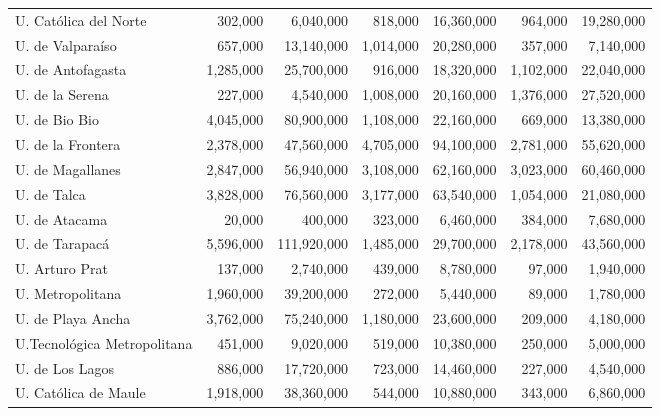 \documentclass[twocolumn]{article}
\begin{document}
\begin{table}
\begin{tabular}{l rr rr rr}
U. Católica del Norte          &     302,000 &     6,040,000 &     818,000 &    16,360,000 &     964,000 &    19,280,000 \\
U. de Valparaíso               &     657,000 &    13,140,000 &   1,014,000 &    20,280,000 &     357,000 &     7,140,000 \\
U. de Antofagasta              &   1,285,000 &    25,700,000 &     916,000 &    18,320,000 &   1,102,000 &    22,040,000 \\
U. de la Serena                &     227,000 &     4,540,000 &   1,008,000 &    20,160,000 &   1,376,000 &    27,520,000 \\
U. de Bio Bio                  &   4,045,000 &    80,900,000 &   1,108,000 &    22,160,000 &     669,000 &    13,380,000 \\
U. de la Frontera              &   2,378,000 &    47,560,000 &   4,705,000 &    94,100,000 &   2,781,000 &    55,620,000 \\
U. de Magallanes               &   2,847,000 &    56,940,000 &   3,108,000 &    62,160,000 &   3,023,000 &    60,460,000 \\
U. de Talca                    &   3,828,000 &    76,560,000 &   3,177,000 &    63,540,000 &   1,054,000 &    21,080,000 \\
U. de Atacama                  &      20,000 &       400,000 &     323,000 &     6,460,000 &     384,000 &     7,680,000 \\
U. de Tarapacá                 &   5,596,000 &   111,920,000 &   1,485,000 &    29,700,000 &   2,178,000 &    43,560,000 \\
U. Arturo Prat                 &     137,000 &     2,740,000 &     439,000 &     8,780,000 &      97,000 &     1,940,000 \\
U. Metropolitana               &   1,960,000 &    39,200,000 &     272,000 &     5,440,000 &      89,000 &     1,780,000 \\
U. de Playa Ancha              &   3,762,000 &    75,240,000 &   1,180,000 &    23,600,000 &     209,000 &     4,180,000 \\
U.Tecnológica Metropolitana    &     451,000 &     9,020,000 &     519,000 &    10,380,000 &     250,000 &     5,000,000 \\
U. de Los Lagos                &     886,000 &    17,720,000 &     723,000 &    14,460,000 &     227,000 &     4,540,000 \\
U. Católica de Maule           &   1,918,000 &    38,360,000 &     544,000 &    10,880,000 &     343,000 &     6,860,000 \\

\end{tabular}
\end{table}
\end{document}
